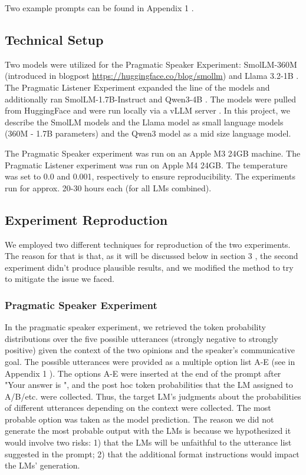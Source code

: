 \documentclass[11pt]{article}
\begin{document}
Two example prompts can be found in Appendix 1 .


\subsection{Technical Setup}
\label{sec:setup}

Two models were utilized for the Pragmatic Speaker Experiment: SmolLM-360M (introduced in blogpost \url{https://huggingface.co/blog/smollm}) and Llama 3.2-1B \citep{grattafiori-2024}. The Pragmatic Listener Experiment expanded the line of the models and additionally ran SmolLM-1.7B-Instruct and Qwen3-4B \citep{yang-2025}. The models were pulled from HuggingFace and were run locally via a vLLM server \citep{kwon-2023}. In this project, we describe the SmolLM models and the Llama model as small language models (360M - 1.7B parameters) and the Qwen3 model as a mid size language model. 

The Pragmatic Speaker experiment was run on an Apple M3 24GB machine. The Pragmatic Listener experiment was run on Apple M4 24GB. The temperature was set to 0.0 and 0.001, respectively to ensure reproducibility. The experiments run for approx. 20-30 hours each (for all LMs combined).


\subsection{Experiment Reproduction}
\label{sec:repr}

We employed two different techniques for reproduction of the two experiments. The reason for that is that, as it will be discussed below in section 3 , the second experiment didn't produce plausible results, and we modified the method to try to mitigate the issue we faced.

\subsubsection{Pragmatic Speaker Experiment}
\label{sec:exp2}

In the pragmatic speaker experiment, we retrieved the token probability distributions over the five possible utterances (strongly negative to strongly positive) given the context of the two opinions and the speaker's communicative goal. The possible utterances were provided as a multiple option list A-E (see in Appendix 1 ). The options A-E were inserted at the end of the prompt after "Your answer is ", and the post hoc token probabilities that the LM assigned to A/B/etc. were collected. Thus, the target LM's judgments about the probabilities of different utterances depending on the context were collected. The most probable option was taken as the model prediction. The reason we did not generate the most probable output with the LMs is because we hypothesized it would involve two risks: 1) that the LMs will be unfaithful to the utterance list suggested in the prompt; 2) that the additional format instructions would impact the LMs' generation.
\end{document}

